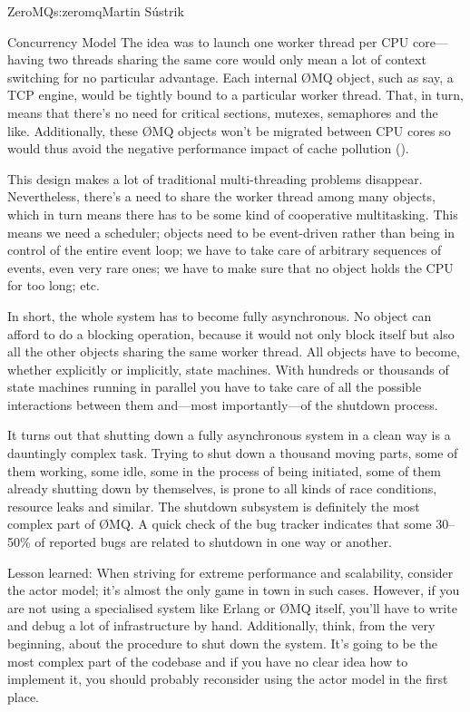 \begin{aosachapter}{ZeroMQ}{s:zeromq}{Martin S\'{u}strik}
\begin{aosasect1}{Concurrency Model}
The idea was to launch one worker thread per CPU core---having two
threads sharing the same core would only mean a lot of context
switching for no particular advantage. Each internal {\O}MQ object, such
as say, a TCP engine, would be tightly bound to a particular worker
thread. That, in turn, means that there's no need for critical
sections, mutexes, semaphores and the like. Additionally, these {\O}MQ
objects won't be migrated between CPU cores so would thus avoid the
negative performance impact of cache pollution
().


This design makes a lot of traditional multi-threading problems
disappear. Nevertheless, there's a need to share the worker thread
among many objects, which in turn means there has to be some kind of
cooperative multitasking. This means we need a scheduler; objects need 
to be event-driven
rather than being in control of the entire event loop; we have to take
care of arbitrary sequences of events, even very rare ones; we have to
make sure that no object holds the CPU for too long; etc.

In short, the whole system has to become fully asynchronous. No object can
afford to do a blocking operation, because it would not only block
itself but also all the other objects sharing the same worker thread. All
objects have to become, whether explicitly or implicitly, state
machines. With hundreds or thousands of state machines running in
parallel you have to take care of all the possible interactions
between them and---most importantly---of the shutdown process.

It turns out that shutting down a fully asynchronous system in a clean
way is a dauntingly complex task. Trying to shut down a thousand moving
parts, some of them working, some idle, some in the process of being
initiated, some of them already shutting down by themselves, is prone
to all kinds of race conditions, resource leaks and similar. The
shutdown subsystem is definitely the most complex part of {\O}MQ. A quick
check of the bug tracker indicates that some 30--50\% of reported bugs
are related to shutdown in one way or another.

Lesson learned: When striving for extreme performance and scalability,
consider the actor model; it's almost the only game in town in such
cases. However, if you are not using a specialised system like Erlang or
{\O}MQ itself, you'll have to write and debug a lot of infrastructure by
hand. Additionally, think, from the very beginning, about the procedure 
to shut down the system. It's going to be the most complex part of the codebase and
if you have no clear idea how to implement it, you should probably
reconsider using the actor model in the first place.


\end{aosasect1}
\end{aosachapter}
